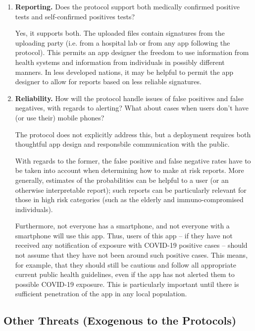 \begin{enumerate}[leftmargin=*]

\item \textbf{Reporting.} Does the protocol support both medically confirmed positive tests and self-confirmed positives tests? 

Yes, it supports both. The uploaded files contain signatures from the uploading party (i.e. from a hospital lab or from any app following the protocol). This permits an app designer the freedom to use information from health systems and information from individuals in possibly different manners. In less developed nations, it may be helpful to permit the app designer to allow for reports based on less reliable signatures. 

\item \textbf{Reliability.} How will the protocol handle issues of false positives and false negatives, with regards to alerting? What about cases when users don't have (or use their) mobile phones?

The protocol does not explicitly address this, but a deployment requires both thoughtful app design and responsbile communication with the public.

With regards to the former, the false positive and false negative rates have to be taken into account when determining how to make at risk reports. More generally, estimates of the probabilities can be helpful to a user (or an otherwise interpretable report); such reports can be particularly relevant for those in high risk categories (such as the elderly and immuno-compromised individuals).  %

Furthermore, not everyone has a smartphone,  and not everyone with a smartphone will use this app. Thus, users of this app -- if they have not received any notification of exposure with COVID-19 positive cases -- should not assume that they have not been around such positive cases. This means, for example, that they should still be cautious and follow all appropriate current public health guidelines, even if the app has not alerted them to possible COVID-19 exposure. This is particularly important until there is sufficient penetration of the app in any local population.


\end{enumerate}


\subsection{Other Threats (Exogenous to the Protocols)}

